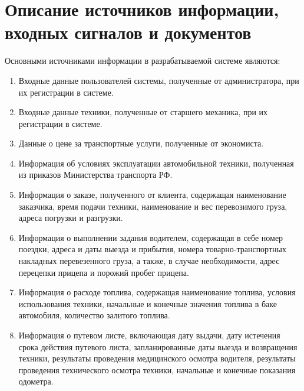 \documentclass[../nirs.tex]{subfiles}
\begin{document}
\section{Описание источников информации, входных сигналов и документов}
Основными источниками информации в разрабатываемой системе являются:
\begin{enumerate}
	\item Входные данные пользователей системы, полученные от администратора,
		при их регистрации в системе.
	\item Входные данные техники, полученные от старшего механика, при их
		регистрации в системе.
	\item Данные о цене за транспортные услуги, полученные от экономиста.
	\item Информация об условиях эксплуатации автомобильной техники, полученная
		из приказов Министерства транспорта РФ.
	\item Информация о заказе, полученного от клиента, содержащая наименование
		заказчика, время подачи техники, наименование и вес перевозимого груза,
		адреса погрузки и разгрузки.
	\item Информация о выполнении задания водителем, содержащая в себе номер
		поездки, адреса и даты выезда и прибытия, номера товарно-транспортных
		накладных перевезенного груза, а также, в случае необходимости, адрес
		перецепки прицепа и порожий пробег прицепа.
	\item Информация о расходе топлива, содержащая наименование топлива, условия
		использования техники, начальные и конечные значения топлива в баке
		автомобиля, количество залитого топлива.
	\item Информация о путевом листе, включающая дату выдачи, дату истечения
		срока действия путевого листа, запланированные даты выезда и возвращения
		техники, результаты проведения медицинского осмотра водителя, результаты
		проведения технического осмотра техники, начальные и конечные показания
		одометра.
\end{enumerate}
\end{document}
